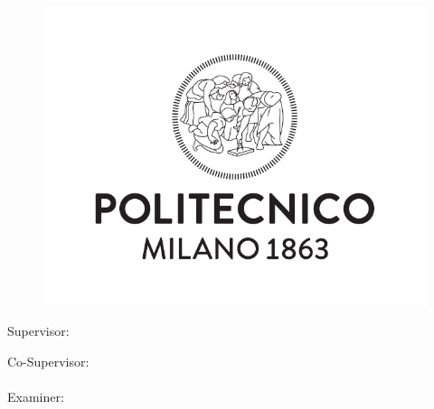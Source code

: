 \begin{titlepage}
    \begin{center}
    	\large
        \spacedlowsmallcaps{\myUni} \\
        \bigskip\myFaculty \\
        \medskip\mySchool \\
    	\medskip\myDepartment \\
    	\bigskip\myCourseFirstPart \\

        \hfill

        \vfill
        
        \begin{figure}[!h]
			\begin{center}
				\includegraphics[width=0.3\columnwidth]{Images/logoPoli.pdf} 
			\end{center}
		\end{figure}
		
		\vfill

        \begingroup
       		\LARGE	
            \color{Maroon} \myTitle
            \bigskip
        \endgroup

        \vfill

		\flushleft 
		\normalsize{Supervisor:}\\
		\medskip\spacedlowsmallcaps{\mySupervisor}

		\flushleft
		\normalsize{Co-Supervisor:}\\
		\medskip\spacedlowsmallcaps{\myOtherSupervisor}\\

        \flushleft
        \normalsize{Examiner:}\\
        \medskip\spacedlowsmallcaps{\myExaminer}\\
        

\end{center}
\end{titlepage}
